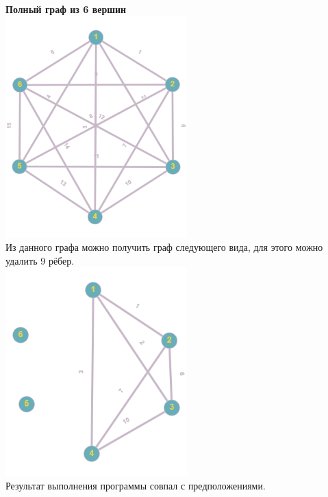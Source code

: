 \documentclass[a4paper,14pt]{extarticle}
\begin{document}
\begin{enumerate}[1.]
        \textbf{Полный граф из 6 вершин}\\
        \includegraphics[width=70mm]{testFull6Before}\\
        Из данного графа можно получить граф следующего вида, для этого можно удалить 9 рёбер.\\
        \includegraphics[width=70mm]{testFull6After}\\
        Результат выполнения программы совпал с предположениями.\\


\end{enumerate}
\end{document}
